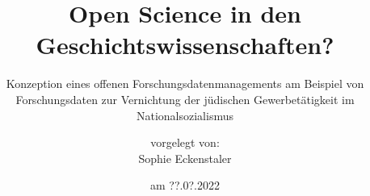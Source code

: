 \titlehead{Humboldt-Universität zu Berlin\\
Philosophische Fakultät\\
Institut für Geschichtswissenschaften\vspace*{4cm}}
\subject{Masterarbeit}
\title{Open Science in den Geschichtswissenschaften?}
\subtitle{Konzeption eines offenen Forschungsdatenmanagements am Beispiel von Forschungsdaten zur Vernichtung der jüdischen Gewerbetätigkeit im Nationalsozialismus}
\author{vorgelegt von:\\Sophie Eckenstaler}
\date{am ??.0?.2022\vspace*{4cm}}
\publishers{\normalsize
    Erstbetreuer: Prof. Dr. Rüdiger Hohls, Institut für Geschichtswissenschaften, HU Berlin\\
    Zweitbetreuer: Prof. Dr. Michael Wildt, Institut für Geschichtswissenschaften, HU Berlin\vspace{0.5cm}
    Studiengang: Master of Arts, Geschichtswissenschaften, Schwerpunkt: Digital History\\
    Matrikelnummer: 596272\\
    eMail: eckensts@hu-berlin.de}


